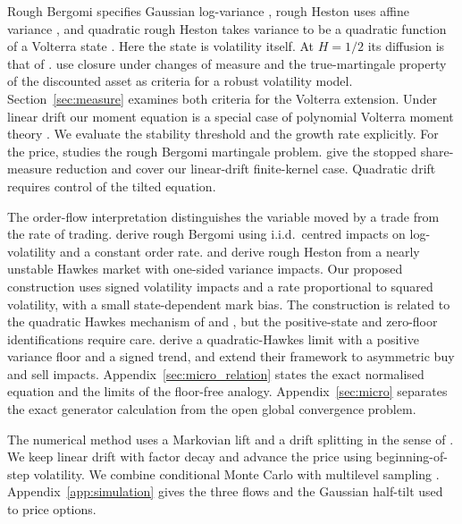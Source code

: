 \documentclass[11pt,a4paper]{article}
\theoremstyle{definition}
\begin{document}
Rough Bergomi specifies Gaussian log-variance \citep{BayerFrizGatheral2016}, rough Heston uses affine variance \citep{ElEuchRosenbaum2019}, and quadratic rough Heston takes variance to be a quadratic function of a Volterra state \citep{GatheralJusselinRosenbaum2020}. Here the state is volatility itself. At $H=1/2$ its diffusion is that of \citet{SeppRakhmonov2023}. \citet{SeppRakhmonov2026} use closure under changes of measure and the true-martingale property of the discounted asset as criteria for a robust volatility model. Section~\ref{sec:measure} examines both criteria for the Volterra extension. Under linear drift our moment equation is a special case of polynomial Volterra moment theory \citep{AbiJaberCuchieroPelizzariPulidoSvalutoFerro2024}. We evaluate the stability threshold and the growth rate explicitly. For the price, \citet{Gassiat2019} studies the rough Bergomi martingale problem. \citet{GuyonJeanninJourdain2026} give the stopped share-measure reduction and cover our linear-drift finite-kernel case. Quadratic drift requires control of the tilted equation.

The order-flow interpretation distinguishes the variable moved by a trade from the rate of trading. \citet{HagerHorstWagenhoferXu2026} derive rough Bergomi using i.i.d.\ centred impacts on log-volatility and a constant order rate. \citet{JaissonRosenbaum2016} and \citet{ElEuchFukasawaRosenbaum2018} derive rough Heston from a nearly unstable Hawkes market with one-sided variance impacts. Our proposed construction uses signed volatility impacts and a rate proportional to squared volatility, with a small state-dependent mark bias. The construction is related to the quadratic Hawkes mechanism of \citet{BlancDonierBouchaud2017} and \citet{DandapaniJusselinRosenbaum2021}, but the positive-state and zero-floor identifications require care.
\citet{DandapaniJusselinRosenbaum2021} derive a quadratic-Hawkes limit with a positive variance floor and a signed trend, and \citet{ChudasamaIyer2025} extend their framework to asymmetric buy and sell impacts. Appendix~\ref{sec:micro_relation} states the exact normalised equation and the limits of the floor-free analogy.
Appendix~\ref{sec:micro} separates the exact generator calculation from the open global convergence problem.

The numerical method uses a Markovian lift \citep{AbiJaberElEuch2019,AlfonsiKebaier2024} and a drift splitting in the sense of \citet{Shinozaki2026}. We keep linear drift with factor decay and advance the price using beginning-of-step volatility. We combine conditional Monte Carlo \citep{Willard1997,RomanoTouzi1997,McCrickerdPakkanen2018} with multilevel sampling \citep{Giles2008}. Appendix~\ref{app:simulation} gives the three flows and the Gaussian half-tilt used to price options.
\end{document}
